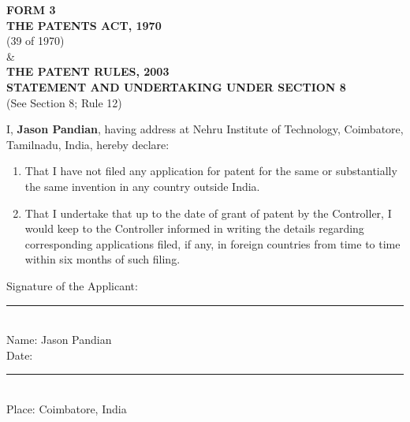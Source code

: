 \documentclass[12pt,a4paper]{article}
\begin{document}
\begin{center}
    \textbf{\large FORM 3} \\
    \vspace{0.2cm}
    \textbf{THE PATENTS ACT, 1970} \\
    (39 of 1970) \\
    \& \\
    \textbf{THE PATENT RULES, 2003} \\
    \vspace{0.4cm}
    \textbf{\large STATEMENT AND UNDERTAKING UNDER SECTION 8} \\
    (See Section 8; Rule 12) \\
\end{center}

\vspace{1cm}

\noindent I, \textbf{Jason Pandian}, having address at Nehru Institute of Technology, Coimbatore, Tamilnadu, India, hereby declare:

\begin{enumerate}
    \item That I have not filed any application for patent for the same or substantially the same invention in any country outside India.
    
    \item That I undertake that up to the date of grant of patent by the Controller, I would keep to the Controller informed in writing the details regarding corresponding applications filed, if any, in foreign countries from time to time within six months of such filing.
\end{enumerate}

\vspace{2cm}

\noindent Signature of the Applicant: \rule{5cm}{0.4pt} \\
Name: Jason Pandian \\
Date: \rule{5cm}{0.4pt} \\
Place: Coimbatore, India
\end{document}
